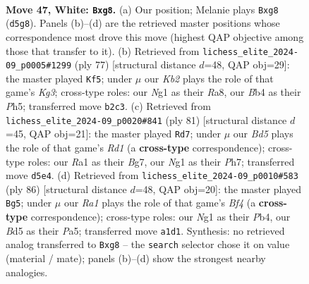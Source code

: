\documentclass[11pt]{article}
\begin{document}
\clearpage

\begin{figure}[p]\centering
\begin{subfigure}{0.46\textwidth}\centering
\resizebox{\linewidth}{!}{%
\newchessgame
\chessboard[
  setfen={3k2r1/8/r7/3B2p1/1B3pb1/PP6/1K5P/R5N1 w - - 2 47},
  showmover=false,
  pgfstyle=straightmove, color=movearrow, markmove={d5-g8}
]}
\caption{}
\end{subfigure}\hfill
\begin{subfigure}{0.46\textwidth}\centering
\resizebox{\linewidth}{!}{%
\newchessgame
\chessboard[
  setfen={r7/8/pBR2pk1/P3b2p/8/5KP1/7P/8 b - - 2 39},
  showmover=false,
  pgfstyle=straightmove, color=movearrow, markmove={g6-f5}
]}
\caption{}
\end{subfigure}
\\[4pt]
\begin{subfigure}{0.46\textwidth}\centering
\resizebox{\linewidth}{!}{%
\newchessgame
\chessboard[
  setfen={3r4/5kbp/p4pp1/3n4/2NB4/1P4P1/P3R3/5K2 b - - 0 41},
  showmover=false,
  pgfstyle=straightmove, color=movearrow, markmove={d8-d7}
]}
\caption{}
\end{subfigure}\hfill
\begin{subfigure}{0.46\textwidth}\centering
\resizebox{\linewidth}{!}{%
\newchessgame
\chessboard[
  setfen={3r2k1/1p4b1/p2PR1P1/P2K4/1P3B1p/7P/8/8 w - - 1 44},
  showmover=false,
  pgfstyle=straightmove, color=movearrow, markmove={f4-g5}
]}
\caption{}
\end{subfigure}
\caption{\textbf{Move 47, White: \texttt{Bxg8}.} (a) Our position; Melanie plays \texttt{Bxg8} (\texttt{d5g8}). Panels (b)--(d) are the retrieved master positions whose correspondence most drove this move (highest QAP objective among those that transfer to it). (b) Retrieved from \texttt{lichess\_elite\_2024-09\_p0005\#1299} (ply 77) [structural distance $d$=48, QAP obj=29]: the master played \texttt{Kf5}; under $\mu$ our \emph{Kb2} plays the role of that game's \emph{Kg3}; cross-type roles: our \emph{N}g1 as their \emph{R}a8, our \emph{B}b4 as their \emph{P}h5; transferred move \texttt{b2c3}. (c) Retrieved from \texttt{lichess\_elite\_2024-09\_p0020\#841} (ply 81) [structural distance $d$=45, QAP obj=21]: the master played \texttt{Rd7}; under $\mu$ our \emph{Bd5} plays the role of that game's \emph{Rd1} (a \textbf{cross-type} correspondence); cross-type roles: our \emph{R}a1 as their \emph{B}g7, our \emph{N}g1 as their \emph{P}h7; transferred move \texttt{d5e4}. (d) Retrieved from \texttt{lichess\_elite\_2024-09\_p0010\#583} (ply 86) [structural distance $d$=48, QAP obj=20]: the master played \texttt{Bg5}; under $\mu$ our \emph{Ra1} plays the role of that game's \emph{Bf4} (a \textbf{cross-type} correspondence); cross-type roles: our \emph{N}g1 as their \emph{P}b4, our \emph{B}d5 as their \emph{P}a5; transferred move \texttt{a1d1}. Synthesis: no retrieved analog transferred to \texttt{Bxg8} -- the \texttt{search} selector chose it on value (material / mate); panels (b)--(d) show the strongest nearby analogies.}
\label{fig:thought-m92}
\end{figure}
\end{document}

